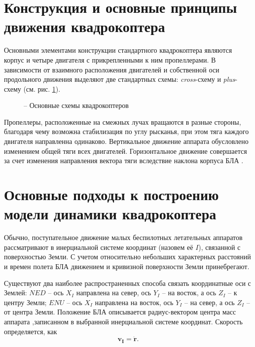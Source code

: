 \section{Конструкция и основные принципы движения квадрокоптера}

Основными элементами конструкции стандартного квадрокоптера являются корпус и четыре двигателя с прикрепленными к ним пропеллерами. В зависимости от взаимного расположения двигателей и собственной оси продольного движения выделяют две стандартных схемы: \textit{cross}-схему и \textit{plus}-схему \cite{Bashi01} (см. рис. \ref{fig:cross_plus}).
\begin{figure}[h!]
	\centering
	\quad
	\caption{ -- Основные схемы квадрокоптеров}
	\label{fig:cross_plus}
\end{figure}
Пропеллеры, расположенные на смежных лучах вращаются в разные стороны, благодаря чему возможна стабилизация по углу рысканья, при этом тяга каждого двигателя направленна одинаково. Вертикальное движение аппарата обусловлено изменением общей тяги всех двигателей. Горизонтальное движение совершается за счет изменения направления вектора тяги вследствие наклона корпуса БЛА \cite{Salih01}. 

\section{Основные подходы к построению модели динамики квадрокоптера}
	
Обычно, поступательное движение малых беспилотных летательных аппаратов рассматривают в инерциальной системе координат (назовем её {$I$}), связанной с поверхностью Земли. С учетом относительно небольших характерных расстояний и времен полета БЛА движением и кривизной поверхности Земли принебрегают.

Существуют два наиболее распространенных способа связать координатные оси с Землей: {$NED$} --  ось \textbf{$X_I$} направлена на север, ось \textbf{$Y_I$} -- на восток, а ось \textbf{$Z_I$} -- к центру Земли; {$ENU$} -- ось \textbf{$X_I$} направлена на восток, ось \textbf{$Y_I$} -- на север, а ось \textbf{$Z_I$} -- от центра Земли. Положение БЛА описывается радиус-вектором центра масс аппарата ,записанном в выбранной инерциальной системе координат. Скорость определяется, как
\begin{equation} \label{eq:velocity}
\bm{v_I} = \dot{\bm{r}}.
\end{equation}


